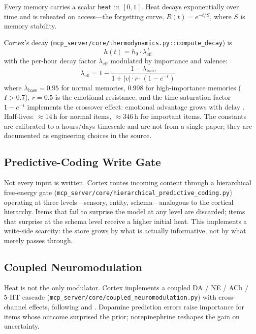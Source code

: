 \documentclass[11pt]{article}
\begin{document}
Every memory carries a scalar \texttt{heat} in $[0, 1]$.  Heat
decays exponentially over time and is reheated on access---the
\citet{Ebbinghaus1885} forgetting curve, $R(t) = e^{-t/S}$, where
$S$ is memory stability.

Cortex's decay
(\texttt{mcp\_server/core/thermodynamics.py::compute\_decay}) is
\begin{equation}
h(t) = h_0 \cdot \lambda_{\mathrm{eff}}^{\,t}
\label{eq:heat-decay}
\end{equation}
with the per-hour decay factor $\lambda_{\mathrm{eff}}$ modulated by
importance and valence:
\begin{equation}
\lambda_{\mathrm{eff}} = 1 - \frac{1 - \lambda_{\mathrm{base}}}
                                     {1 + |v| \cdot r \cdot (1 - e^{-t})}
\label{eq:lambda-eff}
\end{equation}
where $\lambda_{\mathrm{base}} = 0.95$ for normal memories,
$0.998$ for high-importance memories ($I > 0.7$), $r = 0.5$ is the
emotional resistance, and the time-saturation factor $1 - e^{-t}$
implements the \citet{Kleinsmith1963} crossover effect: emotional
advantage grows with delay \citep{Yonelinas2015}.  Half-lives:
$\approx 14$\,h for normal items, $\approx 346$\,h for important
items.  The constants are calibrated to a hours/days timescale and
are not from a single paper; they are documented as engineering
choices in the source.

\subsection{Predictive-Coding Write Gate}
\label{sec:gate}

Not every input is written.  Cortex routes incoming content
through a hierarchical \citet{Friston2010} free-energy gate
(\texttt{mcp\_server/core/hierarchical\_predictive\_coding.py})
operating at three levels---sensory, entity, schema---analogous to
the cortical hierarchy.  Items that fail to surprise the model at
any level are discarded; items that surprise at the schema level
receive a higher initial heat.  This implements a write-side
scarcity: the store grows by what is actually informative, not by
what merely passes through.

\subsection{Coupled Neuromodulation}
\label{sec:neuromod}

Heat is not the only modulator.  Cortex implements a coupled
DA / NE / ACh / 5-HT cascade
(\texttt{mcp\_server/core/coupled\_neuromodulation.py}) with
cross-channel effects, following \citet{Doya2002} and
\citet{Schultz1997}.  Dopamine prediction errors raise importance
for items whose outcome surprised the prior; norepinephrine
reshapes the gain on uncertainty.
\end{document}
